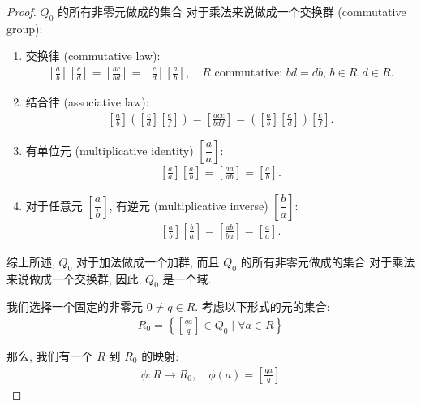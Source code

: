 \documentclass[utf8]{ctexbook}
\theoremstyle{definition}
\begin{document}
\begin{proof}
$Q_0$ 的所有非零元做成的集合 对于乘法来说做成一个交换群 (commutative group):
\begin{enumerate}
\item{交换律 (commutative law):
\begin{align*}
\left[ \frac{a}{b} \right] \left[ \frac{c}{d} \right] = \left[ \frac{ac }{bd} \right] = \left[ \frac{c}{d} \right] \left[ \frac{a}{b} \right] , \quad R \mbox{ commutative: } bd = db, \, b \in R, d \in R .
\end{align*}
}
\item{结合律 (associative law):
\begin{align*}
\left[ \frac{a}{b} \right]  \left(\left[ \frac{c}{d} \right]  \left[ \frac{e}{f} \right]  \right) = \left[ \frac{ac e}{b d f} \right]  = \left( \left[ \frac{a}{b} \right]  \left[ \frac{c}{d} \right] \right) \left[ \frac{e}{f} \right] .
\end{align*}
}
\item{有单位元 (multiplicative identity) $ \left[ \dfrac{a}{a} \right] $:
\begin{align*}
\left[ \frac{a}{a} \right] \left[ \frac{a}{b} \right] = \left[ \frac{aa }{ab} \right] = \left[ \frac{a}{b} \right] .
\end{align*}
}
\item{对于任意元 $\left[ \dfrac{a}{b} \right] $, 有逆元 (multiplicative inverse) $\left[ \dfrac{b}{a} \right] $:
\begin{align*}
\left[ \frac{a}{b} \right] \left[ \frac{b}{a} \right] = \left[ \frac{ab}{ba} \right] = \left[ \frac{a}{a} \right] .
\end{align*}
}
\end{enumerate}

综上所述, $Q_0$ 对于加法做成一个加群, 而且 $Q_0$ 的所有非零元做成的集合 对于乘法来说做成一个交换群, 因此, $Q_0$ 是一个域.

我们选择一个固定的非零元 $ 0 \neq q \in R$. 考虑以下形式的元的集合:
\begin{align*}
R_0 = \left\{ \left[ \frac{q a}{q} \right] \in Q_0 \mid \forall a \in R  \right\} 
\end{align*} 

那么, 我们有一个 $R$ 到 $R_0$ 的映射:
\begin{align*}
\phi: R \longrightarrow R_0, \quad \phi(a) = \left[ \frac{q a}{q} \right]
\end{align*}


\end{proof}
\end{document}
